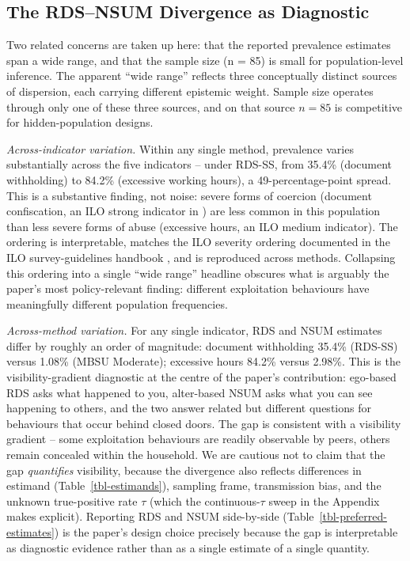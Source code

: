 \documentclass[
  12pt,
  letterpaper,
  DIV=11,
  numbers=noendperiod]{scrartcl}
\begin{document}
\subsection{The RDS--NSUM Divergence as
Diagnostic}\label{sec-divergence}

Two related concerns are taken up here: that the reported prevalence
estimates span a wide range, and that the sample size (n = 85) is small
for population-level inference. The apparent ``wide range'' reflects
three conceptually distinct sources of dispersion, each carrying
different epistemic weight. Sample size operates through only one of
these three sources, and on that source \(n=85\) is competitive for
hidden-population designs.

\emph{Across-indicator variation.} Within any single method, prevalence
varies substantially across the five indicators -- under RDS-SS, from
35.4\% (document withholding) to 84.2\% (excessive working hours), a
49-percentage-point spread. This is a substantive finding, not noise:
severe forms of coercion (document confiscation, an ILO strong indicator
in \textcite{hard24-ilo}) are less common in this population than less
severe forms of abuse (excessive hours, an ILO medium indicator). The
ordering is interpretable, matches the ILO severity ordering documented
in the ILO survey-guidelines handbook \autocite{hard24-ilo}, and is
reproduced across methods. Collapsing this ordering into a single ``wide
range'' headline obscures what is arguably the paper's most
policy-relevant finding: different exploitation behaviours have
meaningfully different population frequencies.

\emph{Across-method variation.} For any single indicator, RDS and NSUM
estimates differ by roughly an order of magnitude: document withholding
35.4\% (RDS-SS) versus 1.08\% (MBSU Moderate); excessive hours 84.2\%
versus 2.98\%. This is the visibility-gradient diagnostic at the centre
of the paper's contribution: ego-based RDS asks what happened to you,
alter-based NSUM asks what you can see happening to others, and the two
answer related but different questions for behaviours that occur behind
closed doors. The gap is consistent with a visibility gradient -- some
exploitation behaviours are readily observable by peers, others remain
concealed within the household. We are cautious not to claim that the
gap \emph{quantifies} visibility, because the divergence also reflects
differences in estimand (Table~\ref{tbl-estimands}), sampling frame,
transmission bias, and the unknown true-positive rate \(\tau\) (which
the continuous-\(\tau\) sweep in the Appendix makes explicit). Reporting
RDS and NSUM side-by-side (Table~\ref{tbl-preferred-estimates}) is the
paper's design choice precisely because the gap is interpretable as
diagnostic evidence rather than as a single estimate of a single
quantity.
\end{document}
